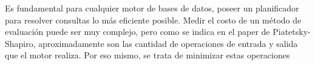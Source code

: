 \quad Es fundamental para cualquier motor de bases de datos, poseer un planificador para resolver consultas lo más eficiente posible. Medir el costo de un m\'etodo de evaluaci\'on puede ser muy complejo, pero como se indica en el paper de Piatetsky-Shapiro, aproximadamente son las cantidad de operaciones de entrada y salida que el motor realiza. Por eso mismo, se trata de minimizar estas operaciones
